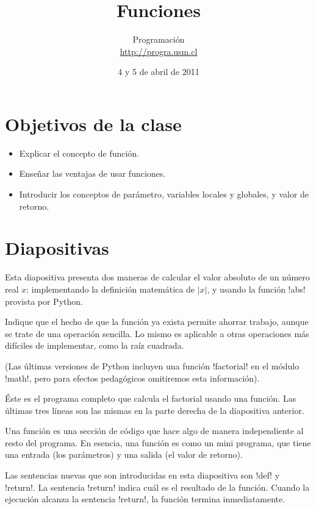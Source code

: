 \documentclass[10pt]{article}
\title{Funciones}
\author{Programación \\ \url{http://progra.usm.cl}}
\date{4 y 5 de abril de 2011}
\begin{document}
  \maketitle

  \section*{Objetivos de la clase}
  \begin{itemize}
    \item Explicar el concepto de función.
    \item Enseñar las ventajas de usar funciones.
    \item Introducir los conceptos de parámetro, variables locales y globales,
      y valor de retorno.
  \end{itemize}

  \section*{Diapositivas}


  Esta diapositiva presenta dos maneras de calcular
  el valor absoluto de un número real \(x\):
  implementando la definición matemática de \(\lvert x\rvert\),
  y usando la función \li!abs! provista por Python.

  Indique que el hecho de que la función ya exista
  permite ahorrar trabajo, aunque se trate de una operación sencilla.
  Lo mismo es aplicable a otras operaciones más difíciles de implementar,
  como la raíz cuadrada.


  

  (Las últimas versiones de Python incluyen una función \li!factorial!
  en el módulo \li!math!,
  pero para efectos pedagógicos
  omitiremos esta información).


  Éste es el programa completo
  que calcula el factorial
  usando una función.
  Las últimas tres líneas son las mismas
  en la parte derecha de la diapositiva anterior.

  Una función es una sección de código que hace algo
  de manera independiente al resto del programa.
  En esencia,
  una función es como un mini programa,
  que tiene una entrada (los parámetros)
  y una salida (el valor de retorno).

  Las sentencias nuevas que son introducidas en esta diapositiva
  son \li!def! y \li!return!.
  La sentencia \li!return! indica cuál es el resultado de la función.
  Cuando la ejecución alcanza la sentencia \li!return!,
  la función termina inmediatamente.
\end{document}
